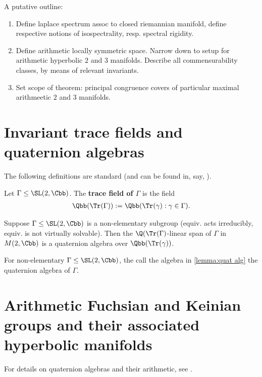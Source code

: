  A putative outline:
 \begin{enumerate}
	 \item Define laplace spectrum assoc to closed riemannian manifold, define respective notions of isospectrality, resp. spectral rigidity.
	 \item Define arithmetic locally symmetric space. Narrow down to setup for arithmetic hyperbolic $2$ and $3$ manifolds. Describe all commensurability classes, by means of relevant invariants.
	 \item Set scope of theorem: principal congruence covers of particular maximal arithmeetic $2$ and $3$ manifolds.
 \end{enumerate}


 \section{Invariant trace fields and quaternion algebras}

 The following definitions are standard (and can be found in, say, \cite[Ch. 3]{maclachlanArithmeticHyperbolic3Manifolds2003}).
 \begin{definition}\label{def:trace field}
	 Let $\Gamma  \leq \SL(2,\Cbb)$. The \textbf{trace field of $\Gamma$} is the field
	 \begin{align*}
		 \Qbb(\Tr(\Gamma)):= \Qbb( \Tr(\gamma) : \gamma \in \Gamma).
	 \end{align*}
 \end{definition}

 \begin{lemma}\label{lemma:quat alg}
	 Suppose $\Gamma \leq \SL(2,\Cbb)$ is a non-elementary subgroup (equiv. acts irreducibly, equiv. is not virtually solvable). Then the $\Q(\Tr(\Gamma)$-linear span of $\Gamma$ in $M(2,\Cbb)$ is a quaternion algebra over $\Qbb(\Tr(\gamma))$.
 \end{lemma}

 \begin{definition}\label{def:quat alg}
	 For non-elementary $\Gamma \leq \SL(2,\Cbb)$, the call the algebra in \ref{lemma:quat alg} the quaternion algebra of $\Gamma$.
 \end{definition}

 \section{Arithmetic Fuchsian and Keinian groups and their associated hyperbolic manifolds}
 For details on quaternion algebras and their arithmetic, see \cite{maclachlanArithmeticHyperbolic3Manifolds2003}.

